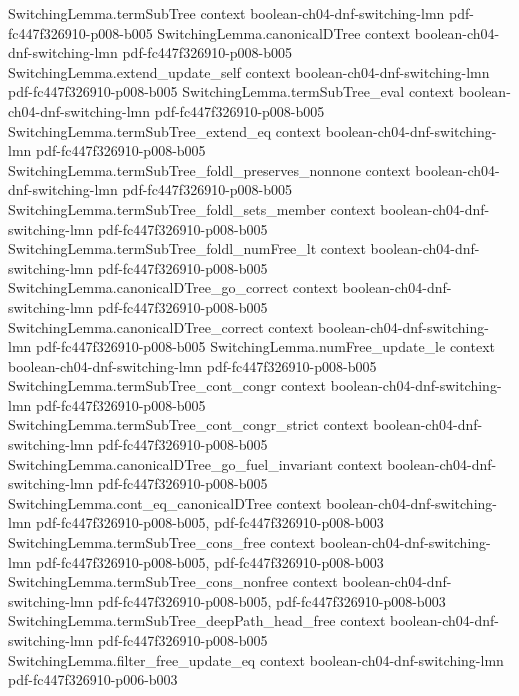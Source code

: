 \begin{lemma}
\proofstep
  {SwitchingLemma.termSubTree}
  {context}
  {boolean-ch04-dnf-switching-lmn}
  {pdf-fc447f326910-p008-b005}
\proofstep
  {SwitchingLemma.canonicalDTree}
  {context}
  {boolean-ch04-dnf-switching-lmn}
  {pdf-fc447f326910-p008-b005}
\proofstep
  {SwitchingLemma.extend_update_self}
  {context}
  {boolean-ch04-dnf-switching-lmn}
  {pdf-fc447f326910-p008-b005}
\proofstep
  {SwitchingLemma.termSubTree_eval}
  {context}
  {boolean-ch04-dnf-switching-lmn}
  {pdf-fc447f326910-p008-b005}
\proofstep
  {SwitchingLemma.termSubTree_extend_eq}
  {context}
  {boolean-ch04-dnf-switching-lmn}
  {pdf-fc447f326910-p008-b005}
\proofstep
  {SwitchingLemma.termSubTree_foldl_preserves_nonnone}
  {context}
  {boolean-ch04-dnf-switching-lmn}
  {pdf-fc447f326910-p008-b005}
\proofstep
  {SwitchingLemma.termSubTree_foldl_sets_member}
  {context}
  {boolean-ch04-dnf-switching-lmn}
  {pdf-fc447f326910-p008-b005}
\proofstep
  {SwitchingLemma.termSubTree_foldl_numFree_lt}
  {context}
  {boolean-ch04-dnf-switching-lmn}
  {pdf-fc447f326910-p008-b005}
\proofstep
  {SwitchingLemma.canonicalDTree_go_correct}
  {context}
  {boolean-ch04-dnf-switching-lmn}
  {pdf-fc447f326910-p008-b005}
\proofstep
  {SwitchingLemma.canonicalDTree_correct}
  {context}
  {boolean-ch04-dnf-switching-lmn}
  {pdf-fc447f326910-p008-b005}
\proofstep
  {SwitchingLemma.numFree_update_le}
  {context}
  {boolean-ch04-dnf-switching-lmn}
  {pdf-fc447f326910-p008-b005}
\proofstep
  {SwitchingLemma.termSubTree_cont_congr}
  {context}
  {boolean-ch04-dnf-switching-lmn}
  {pdf-fc447f326910-p008-b005}
\proofstep
  {SwitchingLemma.termSubTree_cont_congr_strict}
  {context}
  {boolean-ch04-dnf-switching-lmn}
  {pdf-fc447f326910-p008-b005}
\proofstep
  {SwitchingLemma.canonicalDTree_go_fuel_invariant}
  {context}
  {boolean-ch04-dnf-switching-lmn}
  {pdf-fc447f326910-p008-b005}
\proofstep
  {SwitchingLemma.cont_eq_canonicalDTree}
  {context}
  {boolean-ch04-dnf-switching-lmn}
  {pdf-fc447f326910-p008-b005,
    pdf-fc447f326910-p008-b003}
\proofstep
  {SwitchingLemma.termSubTree_cons_free}
  {context}
  {boolean-ch04-dnf-switching-lmn}
  {pdf-fc447f326910-p008-b005,
    pdf-fc447f326910-p008-b003}
\proofstep
  {SwitchingLemma.termSubTree_cons_nonfree}
  {context}
  {boolean-ch04-dnf-switching-lmn}
  {pdf-fc447f326910-p008-b005,
    pdf-fc447f326910-p008-b003}
\proofstep
  {SwitchingLemma.termSubTree_deepPath_head_free}
  {context}
  {boolean-ch04-dnf-switching-lmn}
  {pdf-fc447f326910-p008-b005}
\proofstep
  {SwitchingLemma.filter_free_update_eq}
  {context}
  {boolean-ch04-dnf-switching-lmn}
  {pdf-fc447f326910-p006-b003}

\end{lemma}
